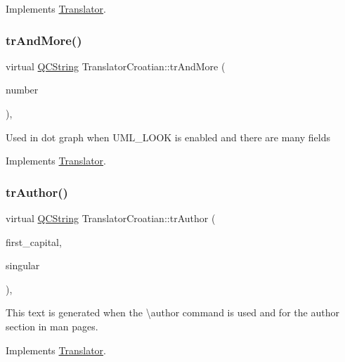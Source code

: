 Implements \mbox{\hyperlink{class_translator}{Translator}}.

\mbox{\label{class_translator_croatian_aef0e197da4aafbb941a5ba5a43ebcd21}} 
\subsubsection{\texorpdfstring{trAndMore()}{trAndMore()}}
{\footnotesize\ttfamily virtual \mbox{\hyperlink{class_q_c_string}{Q\+C\+String}} Translator\+Croatian\+::tr\+And\+More (\begin{DoxyParamCaption}\item[{const \mbox{\hyperlink{class_q_c_string}{Q\+C\+String}} \&}]{number }\end{DoxyParamCaption})\hspace{0.3cm}{\ttfamily [inline]}, {\ttfamily [virtual]}}

Used in dot graph when U\+M\+L\+\_\+\+L\+O\+OK is enabled and there are many fields 

Implements \mbox{\hyperlink{class_translator}{Translator}}.

\mbox{\label{class_translator_croatian_a17dc924e63b5b71a766b57e706b7ddac}} 
\subsubsection{\texorpdfstring{trAuthor()}{trAuthor()}}
{\footnotesize\ttfamily virtual \mbox{\hyperlink{class_q_c_string}{Q\+C\+String}} Translator\+Croatian\+::tr\+Author (\begin{DoxyParamCaption}\item[{bool}]{first\+\_\+capital,  }\item[{bool}]{singular }\end{DoxyParamCaption})\hspace{0.3cm}{\ttfamily [inline]}, {\ttfamily [virtual]}}

This text is generated when the \textbackslash{}author command is used and for the author section in man pages. 

Implements \mbox{\hyperlink{class_translator}{Translator}}.

